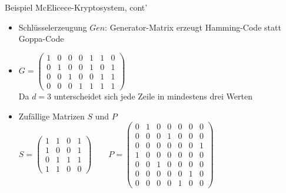\documentclass[11pt%
,aspectratio=169%
]{beamer}
\begin{document}
\begin{frame}{Beispiel McElicece-Kryptosystem, cont'}
    \begin{itemize}
        \item Schlüsselerzeugung $Gen$: Generator-Matrix erzeugt Hamming-Code statt Goppa-Code
        \item $G=\begin{pmatrix} 1 & 0 & 0 & 0 & 1 & 1 & 0 \\ 0 & 1 & 0 & 0 & 1 & 0 & 1 \\ 0 & 0 & 1 & 0 & 0 & 1 & 1 \\ 0 & 0 & 0 & 1 & 1 & 1 & 1 
        \end{pmatrix}$\\
        Da $d=3$ unterscheidet sich jede Zeile in mindestens drei Werten
        \item Zufällige Matrizen $S$ und $P$
        $S=\begin{pmatrix} 1 & 1 & 0 & 1 \\ 1 & 0 & 0 & 1 \\ 0 & 1 & 1 & 1 \\ 1 & 1 & 0 & 0 \end{pmatrix} \qquad
        P=\begin{pmatrix} 0 & 1 & 0 & 0 & 0 & 0 & 0 \\ 0 & 0 & 0 & 1 & 0 & 0 & 0 \\ 0 & 0 & 0 & 0 & 0 & 0 & 1 \\ 1 & 0 & 0 & 0 & 0 & 0 & 0 \\ 0 & 0 & 1 & 0 & 0 & 0 & 0 \\ 0 & 0 & 0 & 0 & 0 & 1 & 0 \\ 0 & 0 & 0 & 0 & 1 & 0 & 0 \end{pmatrix}$
    \end{itemize}
\end{frame}
\end{document}
